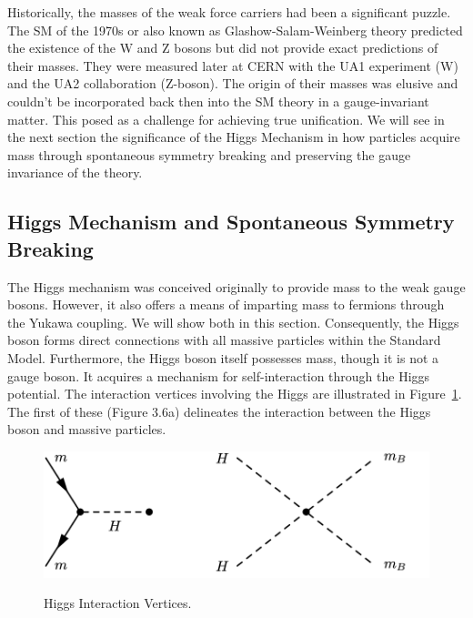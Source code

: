 Historically, the masses of the weak force carriers had been a significant puzzle. The SM of the 1970s or also known as Glashow-Salam-Weinberg theory predicted the existence of the W and Z bosons but did not provide exact predictions of their masses. They were measured later at CERN with the UA1 experiment (W) and the UA2 collaboration (Z-boson). The origin of their masses was elusive and couldn't be incorporated back then into the SM theory in a gauge-invariant matter. This posed as a challenge for achieving true unification. We will see in the next section the significance of the Higgs Mechanism in how particles acquire mass through spontaneous symmetry breaking and preserving the gauge invariance of the theory.




\subsection{Higgs Mechanism and Spontaneous Symmetry Breaking} \label{sec:HiggsMechanism}

The Higgs mechanism was conceived originally to provide mass to the weak gauge bosons. However, it also offers a means of imparting mass to fermions through the Yukawa coupling. We will show both in this section. Consequently, the Higgs boson forms direct connections with all massive particles within the Standard Model. Furthermore, the Higgs boson itself possesses mass, though it is not a gauge boson. It acquires a mechanism for self-interaction through the Higgs potential. The interaction vertices involving the Higgs are illustrated in Figure~\ref{fig:HiggsVertices}. The first of these (Figure 3.6a) delineates the interaction between the Higgs boson and massive particles. 

\begin{figure}[!htbp]
    \centering
    \caption{Higgs Interaction Vertices.}
    \includegraphics[scale=1.0]{fig/HiggsInteraction.png}
    \label{fig:HiggsVertices}
\end{figure}

